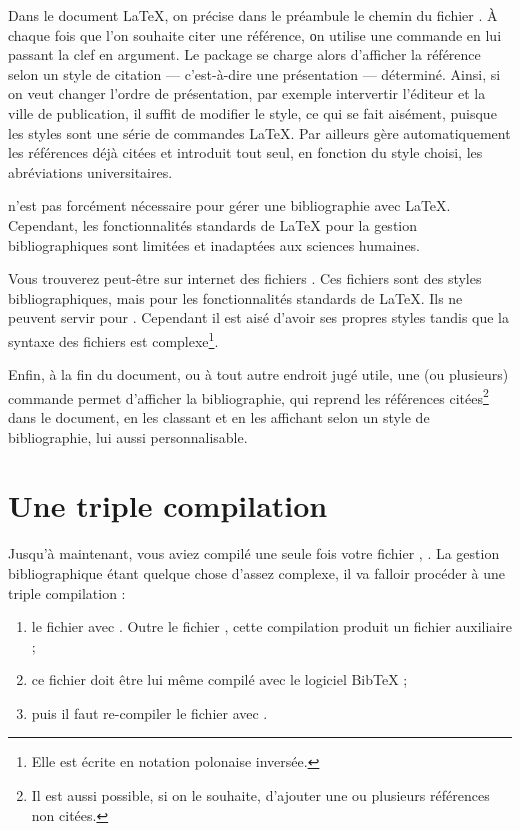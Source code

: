 Dans le document \LaTeX{}, on précise dans le préambule le chemin du fichier . À chaque fois que l'on souhaite citer une référence, οn utilise une commande en lui passant la clef en argument. Le package  se charge alors d'afficher la référence selon un style de citation --- c’est-à-dire une présentation --- déterminé. Ainsi, si on veut changer l'ordre de présentation, par exemple intervertir l'éditeur et la ville de publication, il suffit de modifier le style, ce qui se fait aisément, puisque les styles sont une série de commandes \LaTeX{}. Par ailleurs  gère automatiquement les références déjà citées et introduit tout seul, en fonction du style choisi, les abréviations universitaires. 

\begin{plusloins}

 n'est pas forcément nécessaire pour gérer une bibliographie avec \LaTeX{}. Cependant, les fonctionnalités standards de LaTeX pour la gestion bibliographiques sont limitées et inadaptées aux sciences humaines. 

Vous trouverez peut-être sur internet des fichiers . Ces fichiers sont des styles bibliographiques, mais pour les fonctionnalités standards de \LaTeX{}. Ils ne peuvent servir pour . Cependant il est aisé d'avoir ses propres styles  tandis que la syntaxe des fichiers  est complexe\footnote{Elle est écrite en notation polonaise inversée.}.

\end{plusloins}

Enfin, à la fin du document, ou à tout autre endroit jugé utile, une (ou plusieurs) commande permet d'afficher la bibliographie, qui reprend les références citées\footnote{Il est aussi possible, si on le souhaite, d'ajouter une ou plusieurs références non citées.} dans le document, en les classant et en les affichant selon un style de bibliographie, lui aussi personnalisable.

\section{Une triple compilation}\label{3compil}

Jusqu'à maintenant, vous aviez compilé une seule fois votre fichier , \XeLaTeX. La gestion bibliographique étant quelque chose d'assez complexe, il va falloir procéder à une triple compilation :
\begin{enumerate}
\item le fichier  avec \XeLaTeX. Outre le fichier , cette compilation produit un fichier auxiliaire  ;
\item ce fichier doit être lui même compilé avec le logiciel BibTeX ;
\item puis il faut re-compiler le fichier  avec \XeLaTeX.
\end{enumerate}


